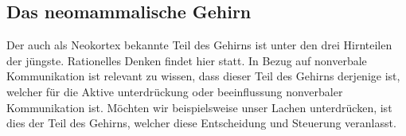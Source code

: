 \subsection{Das neomammalische Gehirn}\label{subsec:das-neomammalische-gehirn}
Der auch als Neokortex bekannte Teil des Gehirns ist unter den drei Hirnteilen der jüngste.
Rationelles Denken findet hier statt.
In Bezug auf nonverbale Kommunikation ist relevant zu wissen, dass dieser Teil des Gehirns derjenige ist,
welcher für die Aktive unterdrückung oder beeinflussung nonverbaler Kommunikation ist.
Möchten wir beispielsweise unser Lachen unterdrücken, ist dies der Teil des Gehirns, welcher diese Entscheidung und Steuerung veranlasst.